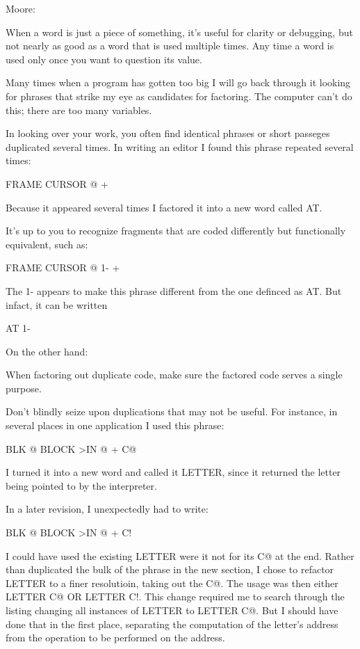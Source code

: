 \bigskip
\blackline{2ex}
\noindent Moore:

\begin{tfquot}
When a word is just a piece of something, it's useful for clarity or debugging, but not nearly as good as a word that is used multiple times. Any time a word is used only once you want to question its value.

Many times when a program has gotten too big I will go back through it looking for phrases that strike my eye as candidates for factoring. The computer can't do this; there are too many variables.
\end{tfquot}
\blackline{1ex}
In looking over your work, you often find identical phrases or short passeges duplicated several times. In writing an editor I found this phrase repeated several times:

\begin{Code}
FRAME  CURSOR @ +
\end{Code}
Because it appeared several times I factored it into a new word called AT.

It's up to you to recognize fragments that are coded differently but functionally equivalent, such as:

\begin{Code}
FRAME  CURSOR @ 1-  +
\end{Code}
The 1- appears to make this phrase different from the one definced as AT. But infact, it can be written

\begin{Code}
AT 1-
\end{Code}
On the other hand:

\begin{tip}
When factoring out duplicate code, make sure the factored code serves a single purpose.
\end{tip}
Don't blindly seize upon duplications that may not be useful. For instance, in several places in one application I used this phrase:

\begin{Code}
BLK @ BLOCK  >IN @ +  C@
\end{Code}
I turned it into a new word and called it LETTER, since it returned the letter being pointed to by the interpreter.

In a later revision, I unexpectedly had to write:

\begin{Code}
BLK @ BLOCK  >IN @ +  C!
\end{Code}
I could have used the existing LETTER were it not for its C@ at the end. Rather than duplicated the bulk of the phrase in the new section, I chose to refactor LETTER to a finer resolutioin, taking out the C@. The usage was then either LETTER C@ OR LETTER C!. This change required me to search through the listing changing all instances of LETTER to LETTER C@. But I should have done that in the first place, separating the computation of the letter's address from the operation to be performed on the address.

